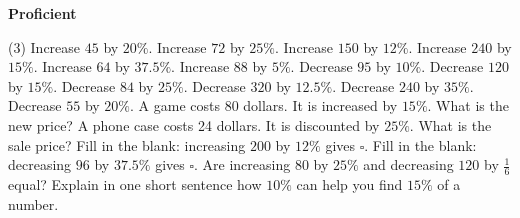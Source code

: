 \documentclass[17pt,a4paper,landscape]{extarticle}
\begin{document}
\sffamily
\boldmath

\boldmath

\boldmath

{\LARGE \textbf{Proficient}}
\begin{tasks}(3)
\task Increase \mbox{$45$} by \mbox{$20\%$}.
\task Increase \mbox{$72$} by \mbox{$25\%$}.
\task Increase \mbox{$150$} by \mbox{$12\%$}.
\task Increase \mbox{$240$} by \mbox{$15\%$}.
\task Increase \mbox{$64$} by \mbox{$37.5\%$}.
\task Increase \mbox{$88$} by \mbox{$5\%$}.
\task Decrease \mbox{$95$} by \mbox{$10\%$}.
\task Decrease \mbox{$120$} by \mbox{$15\%$}.
\task Decrease \mbox{$84$} by \mbox{$25\%$}.
\task Decrease \mbox{$320$} by \mbox{$12.5\%$}.
\task Decrease \mbox{$240$} by \mbox{$35\%$}.
\task Decrease \mbox{$55$} by \mbox{$20\%$}.
\task A game costs 80 dollars. It is increased by \mbox{$15\%$}. What is the new price?
\task A phone case costs 24 dollars. It is discounted by \mbox{$25\%$}. What is the sale price?
\task Fill in the blank: increasing \mbox{$200$} by \mbox{$12\%$} gives \mbox{$\square$}.
\task Fill in the blank: decreasing \mbox{$96$} by \mbox{$37.5\%$} gives \mbox{$\square$}.
\task Are increasing \mbox{$80$} by \mbox{$25\%$} and decreasing \mbox{$120$} by \mbox{$\frac{1}{6}$} equal?
\task Explain in one short sentence how \mbox{$10\%$} can help you find \mbox{$15\%$} of a number.
\end{tasks}
\end{document}
